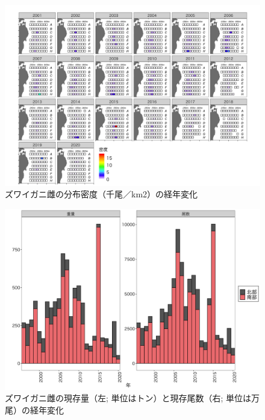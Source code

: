 \documentclass[11pt]{article} %
\begin{document}
\begin{linenumbers}
\begin{figure}[h]
  \centering
  \includegraphics[width = 14cm]{ズワイガニ雌dens.png}
  \caption{ズワイガニ雌の分布密度（千尾／km2）の経年変化}
\end{figure}

\begin{figure}[h]
  \centering
  \includegraphics[width = 14cm]{ズワイガニ雌trend.png}
  \caption{ズワイガニ雌の現存量（左; 単位はトン）と現存尾数（右; 単位は万尾）の経年変化}
\end{figure}


\end{linenumbers}
\end{document}
